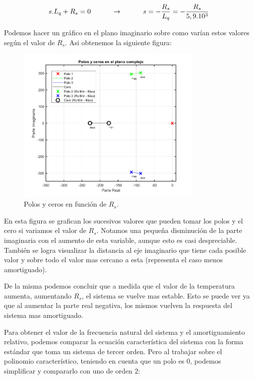 \documentclass{article}
\begin{document}
\begin{equation*}
    s.L_q+ R_s = 0 \quad\quad\quad\to\quad\quad\quad s = - \frac{R_s}{L_q} = - \frac{R_s}{5,9.10^3}\\ 
\end{equation*}

Podemos hacer un gráfico en el plano imaginario sobre como varían estos valores según el valor de 
$R_s$. Asi obtenemos la siguiente figura:

\begin{figure}[H]
    \centering
    \includegraphics[width=0.8\textwidth]{polosyceros.png}
    \caption{Polos y ceros en función de $R_s$.}
\end{figure}

En esta figura se grafican los sucesivos valores que pueden tomar los polos y el cero si variamos el 
valor de $R_s$. Notamos una pequeña disminución de la parte imaginaria con el aumento de esta variable, 
aunque esto es casi despreciable. También se logra visualizar la distancia al eje imaginario que 
tiene cada posible valor y sobre todo el valor mas cercano a esta (representa el caso menos 
amortiguado).

De la misma podemos concluir que a medida que el valor de la temperatura aumenta, aumentando $R_s$, el 
sistema se vuelve mas estable. Esto se puede ver ya que al aumentar la parte real negativa, los 
mismos vuelven la respuesta del sistema mas amortiguado.

Para obtener el valor de la frecuencia natural del sistema y el amortiguamiento relativo, podemos 
comparar la ecuación característica del sistema con la forma estándar que toma un sistema de tercer 
orden. Pero al trabajar sobre el polinomio característico, teniendo en cuenta que un polo es 0, 
podemos simplificar y compararlo con uno de orden 2:
\end{document}
